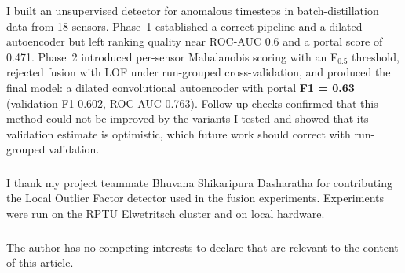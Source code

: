 \documentclass[runningheads]{llncs}
\begin{document}
I built an unsupervised detector for anomalous timesteps in batch-distillation data from 18 sensors. Phase~1 established a correct pipeline and a dilated autoencoder but left ranking quality near ROC-AUC 0.6 and a portal score of 0.471. Phase~2 introduced per-sensor Mahalanobis scoring with an F$_{0.5}$ threshold, rejected fusion with LOF under run-grouped cross-validation, and produced the final model: a dilated convolutional autoencoder with portal \textbf{F1 = 0.63} (validation F1 0.602, ROC-AUC 0.763). Follow-up checks confirmed that this method could not be improved by the variants I tested and showed that its validation estimate is optimistic, which future work should correct with run-grouped validation.

\begin{credits}
\subsubsection{\ackname}
I thank my project teammate Bhuvana Shikaripura Dasharatha for contributing the Local Outlier Factor detector used in the fusion experiments. Experiments were run on the RPTU Elwetritsch cluster and on local hardware.

\subsubsection{\discintname}
The author has no competing interests to declare that are relevant to the content of this article.
\end{credits}



\end{document}

